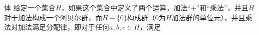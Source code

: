 

\begin{definition}{体}
给定一个集合$H$，如果这个集合中定义了两个运算，加法“+”和“乘法”，并且$H$对于加法构成一个阿贝尔群，而$H-\{0\}$构成群（$0$为$H$加法群的单位元），并且乘法对加法满足分配律，即对于任何$a, b, c\in H$，满足$$
\end{definition}
